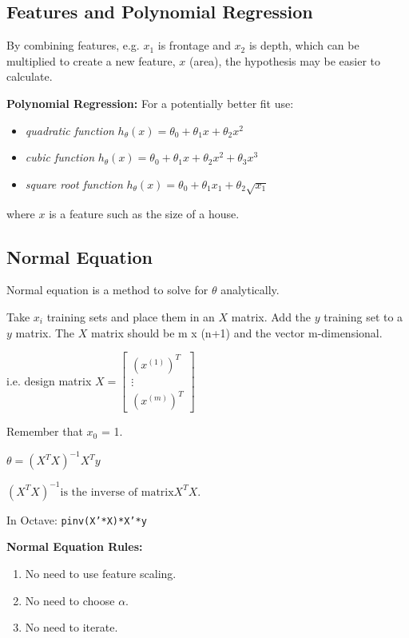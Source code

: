 \documentclass[12pt, a4paper]{article}
\begin{document}
  \subsection{Features and Polynomial Regression}

    By combining features, e.g. $x_1$ is frontage and $x_2$ is depth, which
    can be multiplied to create a new feature, $x$ (area), the hypothesis 
    may be easier to calculate. 

    \textbf{Polynomial Regression:} For a potentially better fit use:
    \begin{itemize}
      \item \emph{quadratic function} $h_\theta(x) = \theta_0 + \theta_1x + 
        \theta_2x^2$ 
      \item \emph{cubic function} $h_\theta(x) = \theta_0 + \theta_1x + 
        \theta_2x^2 + \theta_3x^3$
      \item \emph{square root function} $h_\theta(x) = \theta_0 + 
        \theta_1 x_1 + \theta_2 \sqrt{x_1}$
    \end{itemize}
    where $x$ is a feature such as the size of a house.

  \subsection{Normal Equation}

  Normal equation is a method to solve for $\theta$ analytically.

  Take $x_i$ training sets and place them in an $X$ matrix. Add the $y$ 
    training set to a $y$ matrix. The $X$ matrix should be m x (n+1) and the
    vector m-dimensional. 

  i.e. design matrix $X = \begin{bmatrix} (x^{(1)})^T \\ \vdots \\ 
    (x^{(m)})^T \end{bmatrix}$

  Remember that $x_0$ = 1.
  
  $\theta = (X^TX)^{-1}X^Ty$

  $(X^TX)^{-1} \text{is the inverse of matrix} X^TX$.

  In Octave: \texttt{pinv(X'*X)*X'*y}

  \textbf{Normal Equation Rules:}
  \begin{enumerate}
    \item No need to use feature scaling.
    \item No need to choose $\alpha$.
    \item No need to iterate.
  \end{enumerate}
\end{document}
